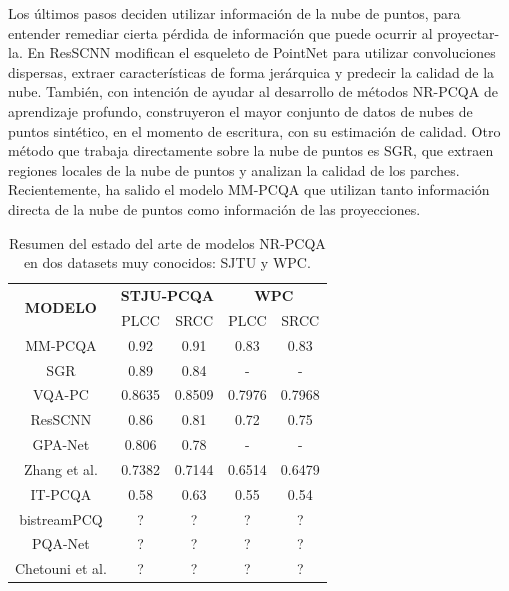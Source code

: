 Los últimos pasos deciden utilizar información de la nube de puntos, para 
entender remediar cierta pérdida de información que puede ocurrir al proyectar-la. 
En ResSCNN\cite{ResSCNN} modifican el esqueleto de PointNet\cite{PointNet} para 
utilizar convoluciones dispersas, extraer características de forma jerárquica y 
predecir la calidad de la nube. También, con intención de ayudar al desarrollo 
de métodos NR-PCQA de aprendizaje profundo, construyeron el mayor conjunto de datos
de nubes de puntos sintético, en el momento de escritura, con su estimación de calidad. 
Otro método que trabaja directamente sobre la nube de puntos es SGR\cite{SGR}, 
que extraen regiones locales de la nube de puntos y analizan la calidad de los parches.
Recientemente, ha salido el modelo MM-PCQA\cite{MM-PCQA} que utilizan tanto información 
directa de la nube de puntos como información de las proyecciones. 

\begin{table}[htp]
    \centering
    \small
    \begin{tabular}{|c|c|c|c|c|}
        \hline
        \multirow{2}{*}{\textbf{MODELO}} & \multicolumn{2}{c|}{\textbf{STJU-PCQA}} & \multicolumn{2}{c|}{\textbf{WPC}} \\
        \cline{2-5}
                        & PLCC & SRCC & PLCC & SRCC\\
        \hline
        MM-PCQA\cite{MM-PCQA} & 0.92 & 0.91 & 0.83 & 0.83\\
        \hline
        SGR\cite{SGR} & 0.89 & 0.84 & - & - \\
        \hline
        VQA-PC\cite{VQA-PC} & 0.8635 & 0.8509 & 0.7976 & 0.7968\\
        \hline
        ResSCNN\cite{ResSCNN} & 0.86 & 0.81 & 0.72 & 0.75\\
        \hline
        GPA-Net\cite{GPA-NET} & 0.806 & 0.78 & - & - \\
        \hline
        Zhang et al.\cite{NR3DQA}& 0.7382 & 0.7144 & 0.6514 & 0.6479\\
        \hline
        IT-PCQA \cite{IT-PCQA}& 0.58 & 0.63 & 0.55  & 0.54\\
        \hline
        bistreamPCQ\cite{bitstreamPCQ} & ? & ? & ? & ?\\
        \hline
        PQA-Net\cite{PQA-Net} & ? & ? & ? & ?\\
        \hline 
        Chetouni et al.\cite{NR-CNN-3D-PC}& ? & ? & ? & ? \\
        \hline
    \end{tabular}
    \caption[Estado del arte de modelos NR-PCQA]{Resumen del estado del arte de modelos NR-PCQA en dos datasets muy conocidos: SJTU\cite{SJTU} y WPC\cite{WPC1,WPC2}.}
\end{table}

